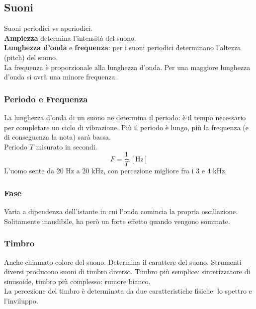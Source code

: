 \documentclass[8pt,a4paper]{article}
\begin{document}
\begin{multicols}{5}
    \subsection{Suoni}
    Suoni periodici vs aperiodici.\\
    \textbf{Ampiezza} determina l'intensità del suono. \\
    \textbf{Lunghezza d'onda} e \textbf{frequenza}: per i suoni periodici determinano
    l'altezza (pitch) del suono.\\
    La frequenza è proporzionale alla lunghezza d'onda. Per una maggiore lunghezza
    d'onda si avrà una minore frequenza.

    \subsubsection{Periodo e Frequenza}
    La lunghezza d'onda di un suono ne determina il periodo: è il tempo
    necessario per completare un ciclo di vibrazione. Più il periodo è lungo, più la
    frequenza (e di conseguenza la nota) sarà bassa. \\
    Periodo $T$ misurato in secondi.
    \begin{equation*}
      F = \frac{1}{T}\ [\text{Hz}]
    \end{equation*}
    \noindent
    L'uomo sente da $20$ Hz a $20$ kHz, con percezione migliore fra i $3$ e $4$ kHz.

    \subsubsection{Fase}
    Varia a dipendenza dell'istante in cui l'onda comincia la propria oscillazione.
    Solitamente inaudibile, ha però un forte effetto quando vengono sommate.

    \subsubsection{Timbro}
    Anche chiamato colore del suono.
    Determina il carattere del suono. Strumenti diversi producono suoni di timbro
    diverso. Timbro più semplice: sintetizzatore di sinusoide, timbro più complesso:
    rumore bianco. \\
    La percezione del timbro è determinata da due caratteristiche fisiche: lo spettro 
    e l’inviluppo.

    \columnbreak


\end{multicols}
\end{document}
